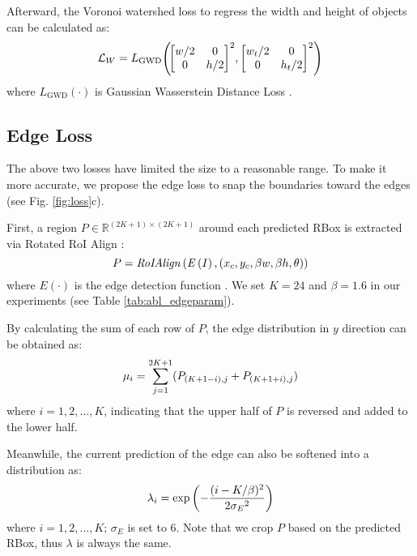 Afterward, the Voronoi watershed loss to regress the width and height of objects can be calculated as:
\begin{equation} \setlength\abovedisplayskip{6pt} \setlength\belowdisplayskip{6pt}
\mathcal{L}_W = L_\text{GWD}\!\left (\! \begin{bmatrix}
 w/2 & 0 \\
 0 & h/2
\end{bmatrix} ^{2}\!,\begin{bmatrix}
 w_t/2 & 0 \\
 0 & h_t/2
\end{bmatrix} ^{2} \right ) 
\end{equation}
where $L_\text{GWD}\left (\cdot\right )$ is Gaussian Wasserstein Distance Loss \cite{yang2023detecting}.

\subsection{Edge Loss}
\label{sec:method-le}

The above two losses have limited the size to a reasonable range. To make it more accurate, we propose the edge loss to snap the boundaries toward the edges (see Fig. \ref{fig:loss}c).

First, a region $P \in \mathbb{R}^{(2K+1)\times (2K+1)}$ around each predicted RBox is extracted via Rotated RoI Align \cite{he2017maskrcnn}:
\begin{equation} \setlength\abovedisplayskip{6pt} \setlength\belowdisplayskip{6pt}
P = \mathit{RoIAlign}\left ( \mathit{E}\left ( I \right ) ,\left ( x_c, y_c, \beta w, \beta h, \theta \right )  \right ) 
\end{equation}
where $\mathit{E}\left ( \cdot \right )$ is the edge detection function \cite{soria2023teed}. We set $K=24$ and $\beta=1.6$ in our experiments (see Table \ref{tab:abl_edgeparam}).

By calculating the sum of each row of $P$, the edge distribution in $y$ direction can be obtained as:
\begin{equation} \setlength\abovedisplayskip{6pt} \setlength\belowdisplayskip{6pt}
\mu_i = \sum_{j=1}^{2K+1} (P_{(K+1-i),j} + P_{(K+1+i),j})
\end{equation}
where $i = 1, 2, \dots, K$, indicating that the upper half of $P$ is reversed and added to the lower half.

Meanwhile, the current prediction of the edge can also be softened into a distribution as: 
\begin{equation} \setlength\abovedisplayskip{6pt} \setlength\belowdisplayskip{6pt}
\lambda_i = \exp\left(-\frac{(i - K / \beta)^2}{2{\sigma_E}^2}\right)
\end{equation}
where $i = 1, 2, \dots, K$; $\sigma_E$ is set to 6. Note that we crop $P$ based on the predicted RBox, thus $\lambda$ is always the same.

